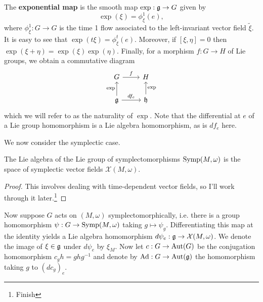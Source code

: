 \documentclass{amsart}
\begin{document}
\begin{definition}
    The \textbf{exponential map} is the smooth map $\exp: \mathfrak g\to G$ given by
    \begin{equation*}
        \exp(\xi) = \phi_\xi^1(e),
    \end{equation*}
    where $\phi_\xi^1:G\to G$ is the time 1 flow associated to the left-invariant
    vector field $\tilde \xi$. It is easy to see that $\exp(t\xi)=\phi^t_\xi(e)$.
    Moreover, if $[\xi,\eta]=0$ then $\exp(\xi+\eta)=\exp(\xi)\exp(\eta)$.
    Finally, for a morphism $f:G\to H$ of Lie groups, we obtain a commutative diagram
    \begin{equation*}
        \begin{tikzcd}
            G\ar{r}{f} & H\\
            \fr g\ar{r}{df_e}\ar{u}{\exp} & \fr h\ar[swap]{u}{\exp}
        \end{tikzcd}
    \end{equation*}
    which we will refer to as the naturality of $\exp$.
    Note that the differential at $e$ of a Lie group homomorphism is a Lie algebra
    homomorphism, as is $df_e$ here.
\end{definition}

We now consider the symplectic case.

\begin{proposition}
    The Lie algebra of the Lie group of symplectomorphisms $\operatorname{Symp}(M,\omega)$ is
    the space of symplectic vector fields $\mathcal{X}(M,\omega)$.
    \label{prop:sympvf}
\end{proposition}
\begin{proof}
    This involves dealing with time-dependent vector fields, so I'll work through
    it later.\footnote{Finish}
\end{proof}

Now suppose $G$ acts on
$(M,\omega)$ symplectomorphically, i.e. there is a group homomorphism $\psi:G\to\operatorname{Symp}(M,\omega)$
taking $g\mapsto\psi_g$. Differentiating this map at the identity yields a Lie
algebra homomorphism $d\psi_e:\mathfrak g\to \mathcal{X}(M,\omega)$. We denote the image of $\xi\in\mathfrak g$
under $d\psi_e$ by $\xi_M$. Now let $c:G\to\operatorname{Aut}(G)$ be the conjugation homomorphism $c_gh=ghg^{-1}$ and
denote by $\operatorname{Ad}:G\to\operatorname{Aut}(\mathfrak g)$ the homomorphism taking $g$ to $(dc_g)_e$.
\end{document}
